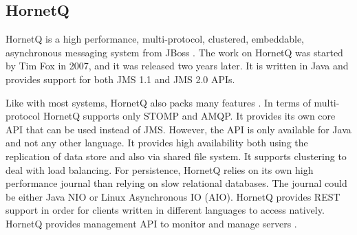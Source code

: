 \subsection{HornetQ}

HornetQ is a high performance, multi-protocol, clustered, embeddable, asynchronous messaging system from JBoss \parencite{giacomelli2012hornetq}. The work on HornetQ was started by Tim Fox in 2007, and it was released two years later. It is written in Java and provides support for both JMS 1.1 and JMS 2.0 APIs. 

Like with most systems, HornetQ also packs many features \parencite{hornetq_features}. In terms of multi-protocol HornetQ supports only STOMP and AMQP. It provides its own core API that can be used instead of JMS. However, the API is only available for Java and not any other language. It provides high availability both using the replication of data store and also via shared file system. It supports clustering to deal with load balancing. For persistence, HornetQ relies on its own high performance journal than relying on slow relational databases. The journal could be either Java NIO or Linux Asynchronous IO (AIO). HornetQ provides REST support in order for clients written in different languages to access natively. HornetQ provides management API to monitor and manage servers \parencite{hornetq_official_site}.
